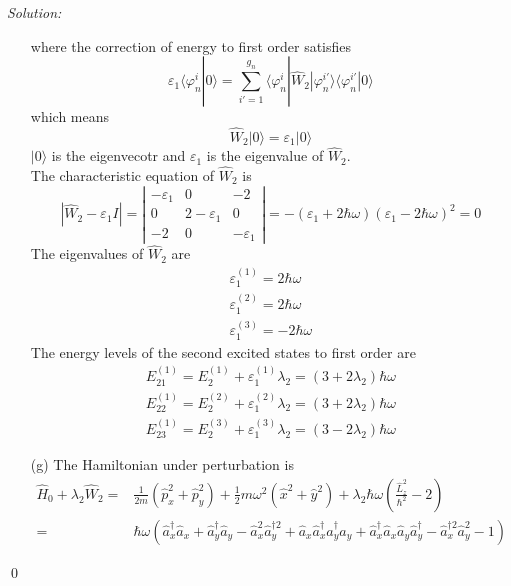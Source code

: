 \documentclass[10pt,a4paper]{article}
\newenvironment{sol}
    {\emph{Solution:}
    }
    {
    \qed
    }
\begin{document}
\begin{sol}
\begin{itemize}
\begin{equation}
\end{equation}
where the correction of energy to first order satisfies
\begin{equation}
\varepsilon_1\langle\varphi_n^i|0\rangle=\sum_{i'=1}^{g_n}\langle\varphi_n^i|\hat{W}_2|\varphi_n^{i'}\rangle\langle\varphi_n^{i'}|0\rangle
\end{equation}
which means
\begin{equation}
\hat{W}_2|0\rangle=\varepsilon_1|0\rangle
\end{equation}
$|0\rangle$ is the eigenvecotr and $\varepsilon_1$ is the eigenvalue of $\hat{W}_2$.\\
The characteristic equation of $\hat{W}_2$ is
\begin{equation}
|\hat{W}_2-\varepsilon_1I|=\left|\begin{array}{ccc}
-\varepsilon_1&0&-2\\
0&2-\varepsilon_1&0\\
-2&0&-\varepsilon_1
\end{array}\right|=-(\varepsilon_1+2\hbar\omega)(\varepsilon_1-2\hbar\omega)^2=0
\end{equation}
The eigenvalues of $\hat{W}_2$ are
\begin{gather}
\varepsilon_1^{(1)}=2\hbar\omega\\
\varepsilon_1^{(2)}=2\hbar\omega\\
\varepsilon_1^{(3)}=-2\hbar\omega
\end{gather}
The energy levels of the second excited states to first order are
\begin{gather}
E_{21}^{(1)}=E_2^{(1)}+\varepsilon_1^{(1)}\lambda_2=(3+2\lambda_2)\hbar\omega\\
E_{22}^{(1)}=E_2^{(2)}+\varepsilon_1^{(2)}\lambda_2=(3+2\lambda_2)\hbar\omega\\
E_{23}^{(1)}=E_2^{(3)}+\varepsilon_1^{(3)}\lambda_2=(3-2\lambda_2)\hbar\omega
\end{gather}
\item[(g)] The Hamiltonian under perturbation is
\begin{align}
\nonumber\hat{H}_0+\lambda_2\hat{W}_2=&\frac{1}{2m}(\hat{p}_x^2+\hat{p}_y^2)+\frac{1}{2}m\omega^2(\hat{x}^2+\hat{y}^2)+\lambda_2\hbar\omega\left(\frac{\hat{L}_z^2}{\hbar^2}-2\right)\\
=&\hbar\omega(\hat{a}_x^{\dagger}\hat{a}_x+\hat{a}_y^{\dagger}\hat{a}_y-\hat{a}_x^2\hat{a}_y^{\dagger2}+\hat{a}_x\hat{a}_x^{\dagger}\hat{a}_y^{\dagger}\hat{a}_y+\hat{a}_x^{\dagger}\hat{a}_x\hat{a}_y\hat{a}_y^{\dagger}-\hat{a}_x^{\dagger2}\hat{a}_y^2-1)

\end{align}
\end{itemize}
\end{sol}
\end{document}
